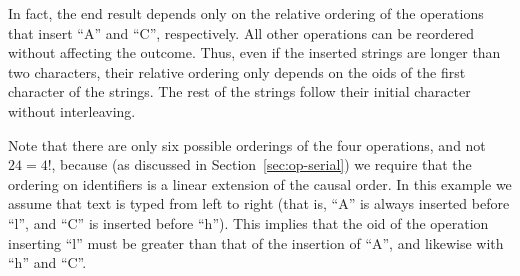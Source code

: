 In fact, the end result depends only on the relative ordering of the operations that insert ``A'' and ``C'', respectively.
All other operations can be reordered without affecting the outcome.
Thus, even if the inserted strings are longer than two characters, their relative ordering only depends on the oids of the first character of the strings.
The rest of the strings follow their initial character without interleaving.

Note that there are only six possible orderings of the four operations, and not $24 = 4!$, because (as discussed in Section~\ref{sec:op-serial}) we require that the ordering on identifiers is a linear extension of the causal order.
In this example we assume that text is typed from left to right (that is, ``A'' is always inserted before ``l'', and ``C'' is inserted before ``h'').
This implies that the oid of the operation inserting ``l'' must be greater than that of the insertion of ``A'', and likewise with ``h'' and ``C''.

